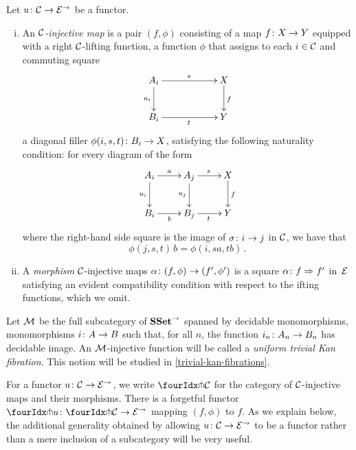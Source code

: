 \documentclass[reqno,10pt,a4paper,oneside]{amsart}
\begin{document}
 \begin{definition} Let $u \co \cal{C} \to \catE^\to$ be a functor. 
 \begin{enumerate}[(i)] 
 \item  An \emph{$\cal{C}$-injective map}
 is a pair $(f, \phi)$ consisting of a map $f \co X \to Y$ equipped with a right  $\cal{C}$-lifting function, \ie 
 a function  $\phi$ that assigns to each $i \in \cal{C}$ and commuting square
\[
\xymatrix@C=2cm{
A_i \ar[r]^{s}   \ar[d]_{u_i} & X \ar[d]^f \\
B_i \ar[r]_{t} & Y}
\]
a diagonal filler $\phi(i,s, t) \co B_i \to X$, satisfying the following naturality 
condition: for every diagram of the form
\[
\xymatrix{
A_i \ar[r]^a \ar[d]_{u_i} & A_j \ar[r]^{s}  \ar[d]_{u_j} & X \ar[d]^f   \\
B_i \ar[r]_{b}  & B_j  \ar[r]_{t}  & Y }
\]
where the right-hand side square is the image of $\sigma \co i \to j$ in $\cal{C}$, 
we have that 
\[
\phi(j, s, t) \, b = \phi(i, s  a, t  b) \, .
\]
\item A \emph{morphism} $\cal{C}$-injective maps $\alpha \co (f, \phi) \to (f', \phi')$ is a 
square $\alpha \co f \Rightarrow f'$ in~$\catE$ satisfying an evident compatibility condition 
with respect to the ifting functions, which we omit. 
\end{enumerate}
\end{definition}

\begin{example}  \label{exa-triv-kan-fib}
Let $\cal{M}$ be the full subcategory of $\SSet^\to$ spanned by decidable mo\-no\-mor\-phisms, \ie
mo\-no\-mor\-phisms $i \co A \to B$ such that, for all $n$, the function $i_n \co A_n \to B_n$ has decidable
image. An $\cal{M}$-injective function will be called a \emph{uniform trivial Kan fibration}. 
This notion will be studied in \cref{trivial-kan-fibrations}. 
\end{example}

For a functor $u \co \cal{C} \to \catE^\to$, we write $\liftr{\cal{C}}$ for the category  of 
$\cal{C}$-injective maps and their morphisms. There is a forgetful functor~$\liftr{u} \co \liftr{\cal{C}} \to \catE^\to$
mapping $(f, \phi)$ to $f$. As we explain below, the additional generality obtained by allowing $u \co \cal{C} \to \catE^\to$ to be a functor rather than a mere inclusion of a  subcategory will be very useful.

\medskip
\end{document}
